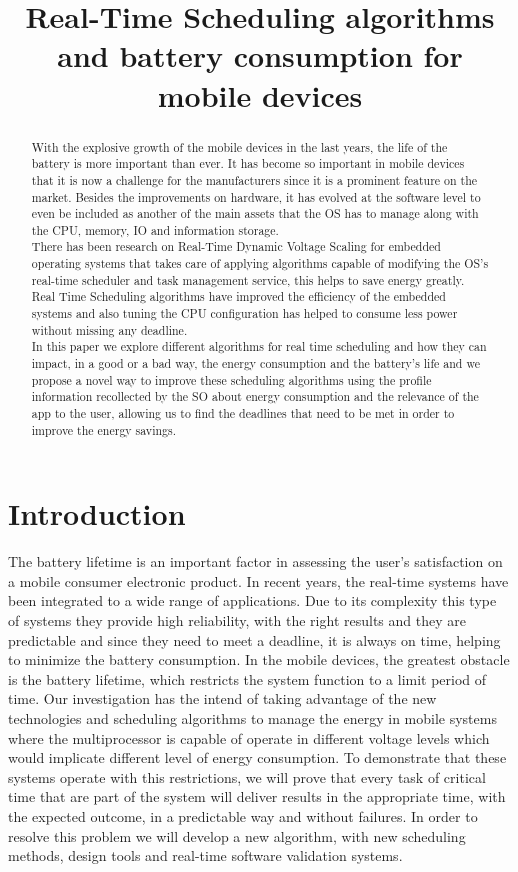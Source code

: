 \documentclass[conference]{IEEEtran}
\title{Real-Time Scheduling algorithms and battery consumption for mobile devices}
\author{\IEEEauthorblockN{David S\'anchez Alb\'an,   Natalia Mar\'in P\'erez,   Luis Diego Chavarr\'ia Ledezma,   Bryant \'Alvarez Canales}
\IEEEauthorblockA{Ingenier\'ia en Computaci\'on\\
Instituto Tecnol\'ogico de Costa Rica\\
San Jos\'e, Costa Rica}
}
\begin{document}
 
\maketitle


\begin{abstract}
With the explosive growth of the mobile devices in the last years, the life of the battery is more important than ever. It has become so important in mobile devices that it is now a challenge for the manufacturers since it is a prominent feature on the market. Besides the improvements on hardware, it has evolved at the software level to even be included as another of the main assets that the OS has to manage along with the CPU, memory, IO and information storage.\\
There has been research on Real-Time Dynamic Voltage Scaling for embedded operating systems that takes care of applying algorithms capable of modifying the OS's real-time scheduler and task management service, this helps to save energy greatly. Real Time Scheduling algorithms have improved the efficiency of the embedded systems and also tuning the CPU configuration has helped to consume less power without missing any deadline. \\
In this paper we explore different algorithms for real time scheduling and how they can impact, in a good or a bad way, the energy consumption and the battery’s life and we  propose a novel way to improve these scheduling algorithms using the profile information recollected by the SO about energy consumption and the relevance of the app to the user, allowing us to find the deadlines that need to be met in order to improve the energy savings.
\end{abstract}

\section{Introduction}

The battery lifetime is an important factor in assessing the user’s satisfaction on a mobile consumer electronic product. In recent years, the real-time systems have been integrated to a wide range of applications. Due to its complexity this type of systems they provide high reliability, with the right results and they are predictable and since they need to meet a deadline, it is always on time, helping to minimize the battery consumption.
In the mobile devices, the greatest obstacle is the battery lifetime, which restricts the system function to a limit period of time. 
Our investigation has the intend of taking advantage of the new technologies and scheduling algorithms to manage the energy in mobile systems where the multiprocessor is capable of operate in different voltage levels which would implicate different level of energy consumption.
To demonstrate that these systems operate with this restrictions, we will prove that every task of critical time that are part of the system will deliver results in the appropriate time, with the expected outcome, in a predictable way and without failures. 
In order to resolve this problem we will develop a new algorithm, with new scheduling methods, design tools and real-time software validation systems.
\end{document}
